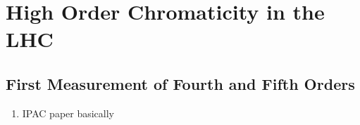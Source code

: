 \chapter{High Order Chromaticity in the LHC}
\thumbforchapter{}
\chaptertoc{}
\newpage

\section{First Measurement of Fourth and Fifth Orders}

\begin{enumerate}
\color{red}
    \item IPAC paper basically
\end{enumerate}